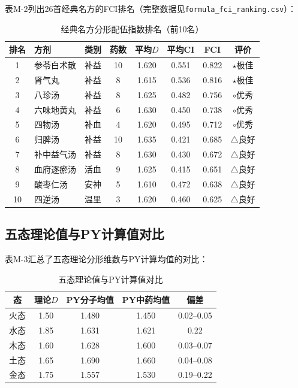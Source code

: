 \documentclass[12pt,a4paper,twocolumn]{article}
\begin{document}
表M-2列出26首经典名方的FCI排名（完整数据见\texttt{formula\_fci\_ranking.csv}）：
\begin{table}[H]
\centering
\footnotesize
\caption{经典名方分形配伍指数排名（前10名）}
\begin{tabular}{c|l|l|c|c|c|c|c}
\hline
\textbf{排名} & \textbf{方剂} & \textbf{类别} & \textbf{药数} & \textbf{平均$D$} & \textbf{平均CI} & \textbf{FCI} & \textbf{评价} \\
\hline
1 & 参苓白术散 & 补益 & 10 & 1.620 & 0.551 & 0.822 & $\star$极佳 \\
2 & 肾气丸 & 补益 & 8 & 1.615 & 0.536 & 0.816 & $\star$极佳 \\
3 & 八珍汤 & 补益 & 8 & 1.625 & 0.482 & 0.756 & $\circ$优秀 \\
4 & 六味地黄丸 & 补益 & 6 & 1.630 & 0.450 & 0.738 & $\circ$优秀 \\
5 & 四物汤 & 补血 & 4 & 1.620 & 0.495 & 0.712 & $\circ$优秀 \\
6 & 归脾汤 & 补益 & 10 & 1.635 & 0.421 & 0.685 & $\triangle$良好 \\
7 & 补中益气汤 & 补益 & 8 & 1.630 & 0.430 & 0.672 & $\triangle$良好 \\
8 & 血府逐瘀汤 & 活血 & 9 & 1.625 & 0.415 & 0.651 & $\triangle$良好 \\
9 & 酸枣仁汤 & 安神 & 5 & 1.610 & 0.472 & 0.638 & $\triangle$良好 \\
10 & 四逆汤 & 温里 & 3 & 1.620 & 0.460 & 0.625 & $\triangle$良好 \\
\hline
\end{tabular}
\end{table}

\subsection{五态理论值与PY计算值对比}
\label{subsec:five_state_comparison}

表M-3汇总了五态理论分形维数与PY计算均值的对比：
\begin{table}[H]
\centering
\caption{五态理论值与PY计算值对比}
\begin{tabular}{c|c|c|c|c}
\hline
\textbf{态} & \textbf{理论$D$} & \textbf{PY分子均值} & \textbf{PY中药均值} & \textbf{偏差} \\
\hline
火态 & 1.50 & 1.480 & 1.450 & 0.02--0.05 \\
水态 & 1.85 & 1.631 & 1.621 & 0.22 \\
木态 & 1.60 & 1.628 & 1.600 & 0.03--0.07 \\
土态 & 1.65 & 1.690 & 1.660 & 0.04--0.08 \\
金态 & 1.75 & 1.557 & 1.530 & 0.19--0.22 \\
\hline
\end{tabular}
\end{table}
\end{document}
